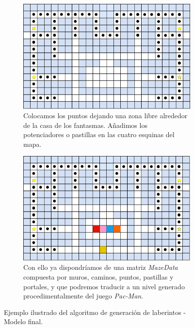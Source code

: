     \begin{figure}[H]
    \ContinuedFloat 
    \centering
    \begin{subfigure}[b]{0.95\textwidth}
            \centering
            \includegraphics[scale=0.45]{img/paso16.png}
            \caption{Colocamos los puntos dejando una zona libre alrededor de la casa de los fantasmas. Añadimos los potenciadores o pastillas en las cuatro esquinas del mapa.}
        \end{subfigure}
        \par\bigskip
        \begin{subfigure}[b]{0.95\textwidth}
            \centering
            \includegraphics[scale=0.45]{img/paso17.png}
            \caption{Con ello ya dispondríamos de una matriz \textit{MazeData} compuesta por muros, caminos, puntos, pastillas y portales, y que podremos traducir a un nivel generado procedimentalmente del juego \textit{Pac-Man}.}
        \end{subfigure}
        
        \caption{Ejemplo ilustrado del algoritmo de generación de laberintos - Modelo final.}
        \label{fig:final2}
    \end{figure}

